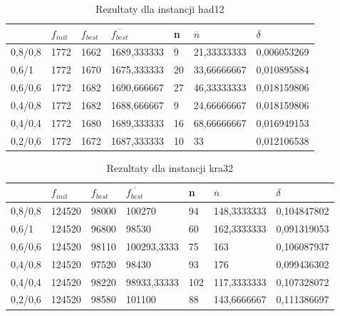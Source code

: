 \begin{table}[H]
\label{T3_had12}
\begin{tabular}{l l l l l l l}
\hline
 & $f_{init}$ & $f_{best}$ & $\overline{f_{best}}$ & n & $\overline{n}$ & $\delta$ \\
\hline
0,8/0,8 & 1772 & 1662 & 1689,333333 & 9 & 21,33333333 & 0,006053269\\
0,6/1 & 1772 & 1670 & 1675,333333 & 20 & 33,66666667 & 0,010895884\\
0,6/0,6 & 1772 & 1682 & 1690,666667 & 27 & 46,33333333 & 0,018159806\\
0,4/0,8 & 1772 & 1682 & 1688,666667 & 9 & 24,66666667 & 0,018159806\\
0,4/0,4 & 1772 & 1680 & 1689,333333 & 16 & 68,66666667 & 0,016949153\\
0,2/0,6 & 1772 & 1672 & 1687,333333 & 10 & 33 & 0,012106538\\
\hline
\end{tabular}
\caption{Rezultaty dla instancji had12}
\end{table}

\begin{table}[H]
\label{T3_kra32}
\begin{tabular}{l l l l l l l}
\hline
 & $f_{init}$ & $f_{best}$ & $\overline{f_{best}}$ & n & $\overline{n}$ & $\delta$ \\
\hline
0,8/0,8 & 124520 & 98000 & 100270 & 94 & 148,3333333 & 0,104847802\\
0,6/1 & 124520 & 96800 & 98530 & 60 & 162,3333333 & 0,091319053\\
0,6/0,6 & 124520 & 98110 & 100293,3333 & 75 & 163 & 0,106087937\\
0,4/0,8 & 124520 & 97520 & 98430 & 93 & 176 & 0,099436302\\
0,4/0,4 & 124520 & 98220 & 98933,33333 & 102 & 117,3333333 & 0,107328072\\
0,2/0,6 & 124520 & 98580 & 101100 & 88 & 143,6666667 & 0,111386697\\

\hline
\end{tabular}
\caption{Rezultaty dla instancji kra32}
\end{table}

